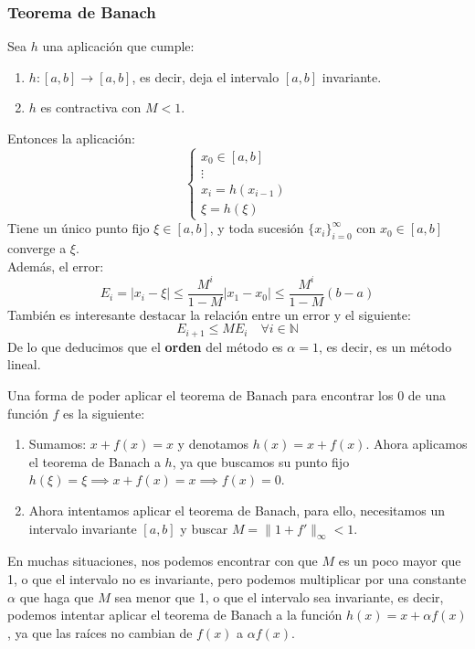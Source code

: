 \subsubsection{Teorema de Banach}

\begin{teorema}
    Sea $h$ una aplicación que cumple:
    \begin{enumerate}
        \item $h:[a,b] \to [a,b]$, es decir, deja el intervalo $[a,b]$ invariante.
        \item $h$ es contractiva con $M<1$.
    \end{enumerate}
    Entonces la aplicación:
    \[
        \begin{cases}
            x_0 \in [a,b] \\
            \vdots \\
            x_i = h(x_{i-1}) \\
            \xi = h(\xi)
        \end{cases}
    \]
    Tiene un único punto fijo $\xi \in [a,b]$, y toda sucesión $\{x_i\}_{i=0}^\infty$ con $x_0 \in [a,b]$ converge a $\xi$.\\
    Además, el error:
    \[
        E_i = |x_i - \xi| \leq \frac{M^i}{1-M}|x_1-x_0| \leq  \frac{M^i}{1-M}(b-a)
    \]
    También es interesante destacar la relación entre un error y el siguiente:
    \[
        E_{i+1} \leq M E_i \quad \forall i \in \mathbb{N} 
    \]
    De lo que deducimos que el \textbf{orden} del método es $\alpha = 1$, es decir, es un método lineal.
\end{teorema}

Una forma de poder aplicar el teorema de Banach para encontrar los 0 de una función $f$ es la siguiente:
\begin{enumerate}
    \item Sumamos: $x + f(x) = x$ y denotamos $h(x) = x + f(x)$. Ahora aplicamos el teorema de Banach a $h$, ya que buscamos su punto fijo $h(\xi) = \xi \implies x + f(x) = x \implies f(x) = 0$.
    \item Ahora intentamos aplicar el teorema de Banach, para ello, necesitamos un intervalo invariante $[a,b]$ y buscar $M= \|1+f'\|_\infty < 1$.
\end{enumerate}

En muchas situaciones, nos podemos encontrar con que $M$ es un poco mayor que 1, o que el intervalo no es invariante, pero podemos multiplicar por una constante $\alpha$ que haga que $M$ sea menor que 1, o que el intervalo sea invariante, es decir, podemos intentar aplicar el teorema de Banach a la función $h(x) = x + \alpha f(x)$, ya que las raíces no cambian de $f(x)$ a $\alpha f(x)$.

